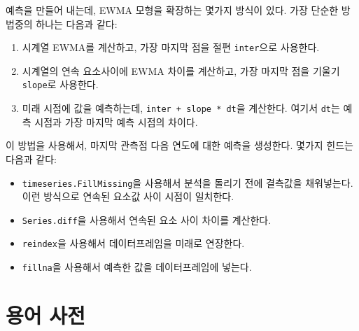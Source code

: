 \begin{exercise}
예측을 만들어 내는데, EWMA 모형을 확장하는 몇가지 방식이 있다.
가장 단순한 방법중의 하나는 다음과 같다:

\begin{enumerate}

\item 시계열 EWMA를 계산하고, 가장 마지막 점을 절편 {\tt inter}으로 사용한다.

\item 시계열의 연속 요소사이에 EWMA 차이를 계산하고, 가장 마지막 점을 기울기 {\tt slope}로 사용한다.

\item 미래 시점에 값을 예측하는데, {\tt inter + slope * dt}을 계산한다.
여기서 {\tt dt}는 예측 시점과 가장 마지막 예측 시점의 차이다.

\end{enumerate}

이 방법을 사용해서, 마지막 관측점 다음 연도에 대한 예측을 생성한다.
몇가지 힌드는 다음과 같다:

\begin{itemize}

\item {\tt timeseries.FillMissing}을 사용해서 분석을 돌리기 전에 결측값을 채워넣는다.
이런 방식으로 연속된 요소값 사이 시점이 일치한다.

\item {\tt Series.diff}을 사용해서 연속된 요소 사이 차이를 계산한다.

\item {\tt reindex}을 사용해서 데이터프레임을 미래로 연장한다.

\item {\tt fillna}을 사용해서 예측한 값을 데이터프레임에 넣는다.

\end{itemize}

\end{exercise}


\section{용어 사전}

